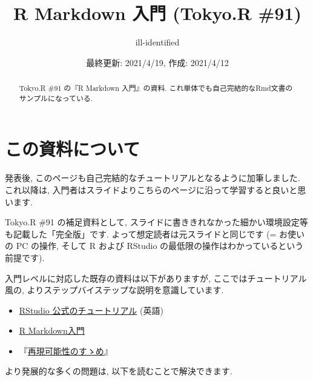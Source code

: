 \documentclass[
]{ltjsarticle}
\title{R Markdown 入門 (Tokyo.R \#91)}
\author{ill-identified}
\date{最終更新: 2021/4/19, 作成: 2021/4/12}
\providecommand{\tightlist}{%
  \setlength{\itemsep}{0pt}\setlength{\parskip}{0pt}}
\newenvironment{infobox}[1]{\begin{itemize}\renewcommand{\labelitemi}{\raisebox{-.7\height}[0pt][0pt]{%
  {\setkeys{Gin}{width=3em,keepaspectratio}\texttt{[image: \_latex/\_img/\#1]}}}}
  \setlength{\fboxsep}{1em}
  \begin{greyblock}
  \item
  }{\end{greyblock}\end{itemize}
}
\begin{document}
\maketitle
\begin{abstract}
Tokyo.R \#91 の『R Markdown 入門』の資料. これ単体でも自己完結的なRmd文書のサンプルになっている.
\end{abstract}

{
\setcounter{tocdepth}{2}
\tableofcontents
}
\newpage

\hypertarget{intro}{%
\section*{この資料について}\label{intro}}

\begin{infobox}{important}
発表後, このページも自己完結的なチュートリアルとなるように加筆しました. これ以降は, 入門者はスライドよりこちらのページに沿って学習すると良いと思います.

\end{infobox}

Tokyo.R \#91 の補足資料として, スライドに書ききれなかった細かい環境設定等も記載した「完全版」です. よって想定読者は元スライドと同じです (= お使いの PC の操作, そして R および RStudio の最低限の操作はわかっているという前提です).

入門レベルに対応した既存の資料は以下がありますが, ここではチュートリアル風の, よりステップバイステップな説明を意識しています.

\begin{itemize}
\tightlist
\item
  \href{https://rmarkdown.rstudio.com/lesson-1.html}{RStudio 公式のチュートリアル} (英語)
\item
  \href{https://kazutan.github.io/kazutanR/Rmd_intro.html}{R Markdown入門}
\item
  \citet{Takahashi2018}『\href{https://www.kyoritsu-pub.co.jp/bookdetail/9784320112438}{再現可能性のすゝめ}』
\end{itemize}

より発展的な多くの問題は, 以下を読むことで解決できます.
\end{document}
